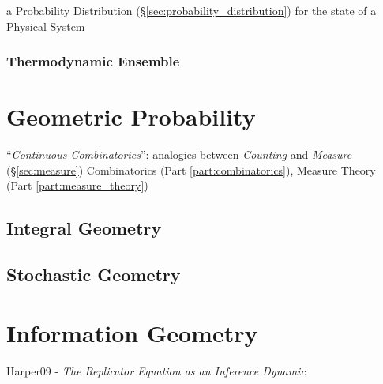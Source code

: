 a Probability Distribution (\S\ref{sec:probability_distribution}) for the state
of a Physical System



\subsubsection{Thermodynamic Ensemble}\label{sec:thermodynamic_ensemble}



\section{Geometric Probability}\label{sec:geometric_probability}

``\emph{Continuous Combinatorics}'': analogies between \emph{Counting} and
\emph{Measure} (\S\ref{sec:measure}) \fist Combinatorics (Part
\ref{part:combinatorics}), Measure Theory (Part \ref{part:measure_theory})



\subsection{Integral Geometry}\label{sec:integral_geometry}

\subsection{Stochastic Geometry}\label{sec:stochastic_geometry}



\section{Information Geometry}\label{sec:information_geometry}

Harper09 - \emph{The Replicator Equation as an Inference Dynamic}


